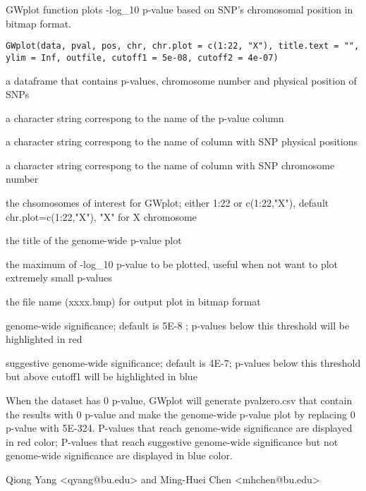 \begin{Description}\relax
GWplot function plots -log_{10} p-value based on SNP's chromosomal position in bitmap format.
\end{Description}
\begin{Usage}
\begin{verbatim}
GWplot(data, pval, pos, chr, chr.plot = c(1:22, "X"), title.text = "", ylim = Inf, outfile, cutoff1 = 5e-08, cutoff2 = 4e-07)
\end{verbatim}
\end{Usage}
\begin{Arguments}
\begin{ldescription}
\item[\code{data}] a dataframe that contains p-values, chromosome number and physical position of SNPs 
\item[\code{pval}] a character string correspong to the name of the p-value column 
\item[\code{pos}] a character string correspong to the name of column with SNP physical positions  
\item[\code{chr}] a character string correspong to the name of column with SNP chromosome number 
\item[\code{chr.plot}] the chsomosomes of interest for GWplot; either 1:22 or c(1:22,"X"), default chr.plot=c(1:22,"X"), "X" for X chromosome 
\item[\code{title.text}] the title of the genome-wide p-value plot 
\item[\code{ylim}] the maximum of -log_{10} p-value to be plotted, useful when not want to plot extremely small p-values 
\item[\code{outfile}] the file name (xxxx.bmp) for output plot in bitmap format 
\item[\code{cutoff1}] genome-wide significance; default is 5E-8 ; p-values below this threshold will be highlighted in red
\item[\code{cutoff2}] suggestive genome-wide significance; default is 4E-7; p-values below this threshold but above cutoff1 will be highlighted in blue 
\end{ldescription}
\end{Arguments}
\begin{Details}\relax
When the dataset has 0 p-value, GWplot will generate pvalzero.csv that contain the results with 0 p-value and make the genome-wide p-value
plot by replacing 0 p-value with 5E-324. P-values that reach genome-wide significance are displayed in red color; P-values that reach 
suggestive genome-wide significance but not genome-wide significance are displayed in blue color.
\end{Details}
\begin{Author}\relax
Qiong Yang <qyang@bu.edu> and Ming-Huei Chen <mhchen@bu.edu>
\end{Author}

